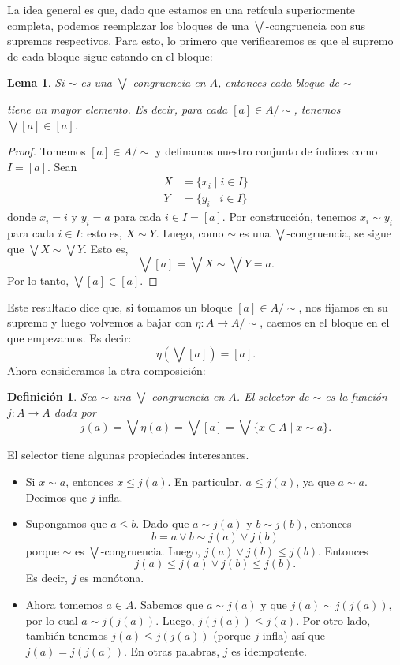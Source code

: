 \documentclass[12pt,letterpaper,titlepage]{article}
\newtheorem*{defn}{Definición}
\newtheorem*{lemma}{Lema}
\theoremstyle{definition}
\renewcommand\sup{\vee}
\newcommand\Sup{\bigvee}
\newcommand\simr{{\sim}}
\newcommand\<{\langle}
\renewcommand\>{\rangle}
\begin{document}
La idea general es que, dado que estamos en una retícula superiormente completa,
podemos reemplazar los bloques de una $\Sup$-congruencia con sus supremos 
respectivos.
Para esto, lo primero que verificaremos es que el supremo de cada bloque sigue
estando en el bloque:
\begin{lemma}
    Si $\sim$ es una $\Sup$-congruencia en $A$, entonces cada bloque de $\simr$

   tiene un mayor elemento.
    Es decir, para cada $[a]\in A/\simr$, tenemos $\Sup[a]\in [a]$.
\end{lemma}
\begin{proof}
    Tomemos $[a]\in A/\simr$ y definamos nuestro conjunto de índices como $I=[a]$.
    Sean
    \begin{align*}
        X &= \{x_i \mid i\in I\} \\
        Y &= \{y_i \mid i\in I\}
    \end{align*}
    donde $x_i=i$ y $y_i=a$ para cada $i\in I=[a]$.
    Por construcción, tenemos $x_i\sim y_i$ para cada $i\in I$: esto es, $X\sim Y$.
    Luego, como $\sim$ es una $\Sup$-congruencia, se sigue que $\Sup X\sim\Sup Y$.
    Esto es,
    \[
        \Sup[a] = \Sup X \sim \Sup Y = a
    .\]
    Por lo tanto, $\Sup [a]\in [a]$.
\end{proof}
Este resultado dice que, si tomamos un bloque $[a]\in A/\simr$, nos fijamos en su
supremo y luego volvemos a bajar con $\eta:A\to A/\simr$, caemos en
el bloque en el que empezamos.
Es decir:
\[
    \eta(\Sup [a]) = [a]
.\]
Ahora consideramos la otra composición:
\begin{defn}
    Sea $\simr$ una $\Sup$-congruencia en $A$.
    El \emph{selector} de $\simr$ es la función $j:A\to A$ dada por
    \[
        j(a) = \Sup\eta(a) = \Sup[a] = \Sup\{x\in A \mid x\sim a\}
    .\]
\end{defn}
El selector tiene algunas propiedades interesantes.
\begin{itemize}
    \item 
    Si $x\sim a$, entonces $x\leq j(a)$.
    En particular, $a\leq j(a)$, ya que $a\sim a$.
    Decimos que $j$ infla.
    \item
    Supongamos que $a\leq b$.
    Dado que $a\sim j(a)$ y $b\sim j(b)$, entonces
    \[
        b = a\sup b \sim j(a) \sup j(b)
    \]
    porque $\simr$ es $\Sup$-congruencia.
    Luego, $j(a) \sup j(b) \leq j(b)$.
    Entonces
    \[
        j(a)\leq j(a)\sup j(b) \leq j(b)
    .\]
    Es decir, $j$ es monótona.
    \item
    Ahora tomemos $a\in A$.
    Sabemos que $a\sim j(a)$ y que $j(a)\sim j(j(a))$,
    por lo cual $a\sim j(j(a))$.
    Luego, $j(j(a))\leq j(a)$.
    Por otro lado, también tenemos $j(a)\leq j(j(a))$ (porque $j$ infla) así que
    $j(a)=j(j(a))$.
    En otras palabras, $j$ es idempotente.
\end{itemize}
\end{document}
